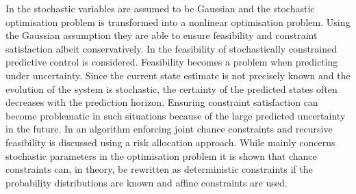 In \cite{li2} the stochastic variables are assumed to be Gaussian and the stochastic optimisation problem is transformed into a nonlinear optimisation problem. Using the Gaussian assumption they are able to ensure feasibility and constraint satisfaction albeit conservatively. In \cite{masahiro} the feasibility of stochastically constrained predictive control is considered. Feasibility becomes a problem when predicting under uncertainty. Since the current state estimate is not precisely known and the evolution of the system is stochastic, the certainty of the predicted states often decreases with the prediction horizon. Ensuring constraint satisfaction can become problematic in such situations because of the large predicted uncertainty in the future. In \cite{masahiro} an algorithm enforcing joint chance constraints and recursive feasibility is discussed using a risk allocation approach. While \cite{schwarm} mainly concerns stochastic parameters in the optimisation problem it is shown that chance constraints can, in theory, be rewritten as deterministic constraints if the probability distributions are known and affine constraints are used. 

